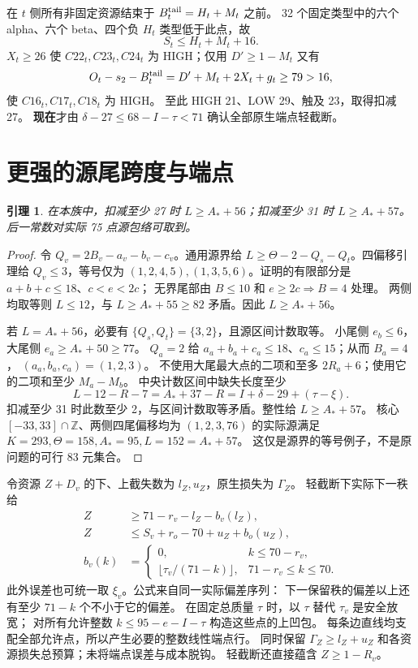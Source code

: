 \documentclass[11pt,a4paper]{article}
\newtheorem{lemma}[theorem]{引理}
\newcommand{\Z}{\mathbb Z}
\newcommand{\A}{A_*}
\begin{document}
在 $t$ 侧所有非固定资源结束于 $B_t^{\rm tail}=H_t+M_t$ 之前。
32 个固定类型中的六个 alpha、六个 beta、四个负 $H_t$ 类型低于此点，故
\begin{equation}S_t\le H_t+M_t+16.\label{eq:ttail}\end{equation}
$X_t\ge26$ 使 $C22_t,C23_t,C24_t$ 为 HIGH；仅用 $D'\ge1-M_t$ 又有
\[
 O_t-s_2-B_t^{\rm tail}=D'+M_t+2X_t+g_t\ge79>16,
\]
使 $C16_t,C17_t,C18_t$ 为 HIGH。
至此 HIGH 21、LOW 29、触及 23，取得扣减 27。
\textbf{现在}才由 $\delta-27\le68-I-\tau<71$ 确认全部原生端点轻截断。

\section{更强的源尾跨度与端点}
\begin{lemma}\label{lem:L}
在本族中，扣减至少 27 时 $L\ge\A+56$；扣减至少 31 时 $L\ge\A+57$。
后一常数对实际 75 点源包络可取到。
\end{lemma}
\begin{proof}
令 $Q_v=2B_v-a_v-b_v-c_v$。通用源界给
$L\ge\Theta-2-Q_s-Q_t$。四偏移引理给 $Q_v\le3$，等号仅为
$(1,2,4,5),(1,3,5,6)$。证明的有限部分是 $a+b+c\le18$、$c<e<2c$；
无界尾部由 $B\le10$ 和 $e\ge2c\Rightarrow B=4$ 处理。
两侧均取等则 $L\le12$，与 $L\ge\A+55\ge82$ 矛盾。因此 $L\ge\A+56$。

若 $L=\A+56$，必要有 $\{Q_s,Q_t\}=\{3,2\}$，且源区间计数取等。
小尾侧 $e_b\le6$，大尾侧 $e_a\ge\A+50\ge77$。
$Q_a=2$ 给 $a_a+b_a+c_a\le18$、$c_a\le15$；从而 $B_a=4$，
$(a_a,b_a,c_a)=(1,2,3)$。
不使用大尾最大点的二项和至多 $2R_a+6$；使用它的二项和至少 $M_a-M_b$。
中央计数区间中缺失长度至少
\[
 L-12-R-7=\A+37-R=I+\delta-29+(\tau-\xi).
\]
扣减至少 31 时此数至少 2，与区间计数取等矛盾。整性给 $L\ge\A+57$。
核心 $[-33,33]\cap\Z$、两侧四尾偏移均为 $(1,2,3,76)$ 的实际源满足
$K=293,\Theta=158,\A=95,L=152=\A+57$。
这仅是源界的等号例子，不是原问题的可行 83 元集合。
\end{proof}

令资源 $Z+D_v$ 的下、上截失数为 $l_Z,u_Z$，原生损失为 $\Gamma_Z$。
轻截断下实际下一秩给
\begin{align*}
 Z&\ge71-r_v-l_Z-b_v(l_Z),\\
 Z&\le S_v+r_o-70+u_Z+b_o(u_Z),\\
 b_v(k)&=\begin{cases}0,&k\le70-r_v,\\
 \lfloor\tau_v/(71-k)\rfloor,&71-r_v\le k\le70.
 \end{cases}
\end{align*}
此外误差也可统一取 $\xi_v$。公式来自同一实际偏差序列：
下一保留秩的偏差以上还有至少 $71-k$ 个不小于它的偏差。
在固定总质量 $\tau$ 时，以 $\tau$ 替代 $\tau_v$ 是安全放宽；
对所有允许整数 $k\le95-e-I-\tau$ 构造这些点的上凹包。
每条边直线均支配全部允许点，所以产生必要的整数线性端点行。
同时保留 $\Gamma_Z\ge l_Z+u_Z$ 和各资源损失总预算；未将端点误差与成本脱钩。
轻截断还直接蕴含 $Z\ge1-R_v$。
\end{document}
